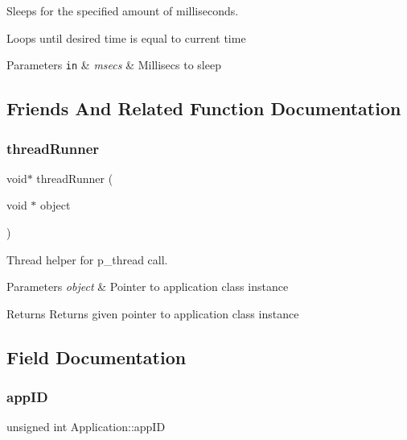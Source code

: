 Sleeps for the specified amount of milliseconds. 

Loops until desired time is equal to current time


\begin{DoxyParams}[1]{Parameters}
\mbox{\tt in}  & {\em msecs} & Millisecs to sleep \\
\hline
\end{DoxyParams}


\subsection{Friends And Related Function Documentation}
\hypertarget{class_application_ae5e6102d305713891fb23b83d4acf306}{}\label{class_application_ae5e6102d305713891fb23b83d4acf306} 
\subsubsection{\texorpdfstring{thread\+Runner}{threadRunner}}
{\footnotesize\ttfamily void$\ast$ thread\+Runner (\begin{DoxyParamCaption}\item[{void $\ast$}]{object }\end{DoxyParamCaption})\hspace{0.3cm}{\ttfamily [friend]}}



Thread helper for p\+\_\+thread call. 


\begin{DoxyParams}{Parameters}
{\em object} & Pointer to application class instance\\
\hline
\end{DoxyParams}
\begin{DoxyReturn}{Returns}
Returns given pointer to application class instance 
\end{DoxyReturn}


\subsection{Field Documentation}
\hypertarget{class_application_ab60884b656840152d696b93a272ed2b0}{}\label{class_application_ab60884b656840152d696b93a272ed2b0} 
\subsubsection{\texorpdfstring{app\+ID}{appID}}
{\footnotesize\ttfamily unsigned int Application\+::app\+ID\hspace{0.3cm}{\ttfamily [private]}}

